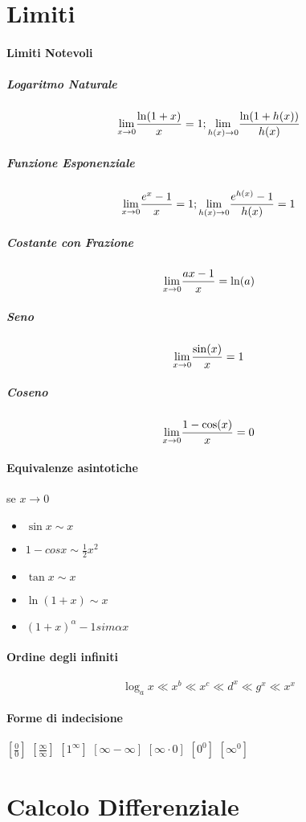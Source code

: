 \documentclass[12pt, a4paper, openany]{book}
\begin{document}
	\section*{Limiti}
	\paragraph*{Limiti Notevoli}

	\subparagraph*{Logaritmo Naturale}
	$$\underset{x \to 0}{\lim} \frac{\ln(1+x)}{x} = 1 ; \underset{h(x) \to 0}{\lim} \frac{\ln(1+h(x))}{h(x)}$$

	\subparagraph*{Funzione Esponenziale}
	$$\underset{x \to 0}{\lim} \frac{e^x-1}{x} = 1; \underset{h(x) \to 0}{\lim} \frac{e^{h(x)}-1}{h(x)} = 1$$

	\subparagraph*{Costante con Frazione}
	$$\underset{x \to 0}{\lim}\frac{ax -1}{x} = \ln(a)$$

	\subparagraph*{Seno}
	$$\underset{x \to 0}{\lim}\frac{\sin(x)}{x} = 1$$

	\subparagraph*{Coseno}
	$$\underset{x \to 0}{\lim} \frac{1-\cos(x)}{x} = 0 $$

	\paragraph*{Equivalenze asintotiche} se $x\to 0$
	\begin{itemize}
		\item $\sin x \sim x$
		\item $1-cos x \sim \frac{1}{2}x^2$
		\item $\tan x \sim x$
		\item $\ln(1+x) \sim x$
		\item $(1+x)^\alpha -1 sim \alpha x$
	\end{itemize}

	\paragraph*{Ordine degli infiniti}
	$$ \log_ax\ll x^b\ll x^c\ll d^x\ll g^x\ll x^x $$


	\paragraph*{Forme di indecisione}
$[\frac{0}{0}]$ $[\frac{\infty}{\infty}]$ $[1^\infty]$ $[\infty - \infty]$ $[\infty \cdot 0]$ $[0^0]$ $[\infty^0]$

	\section*{Calcolo Differenziale}
\end{document}
